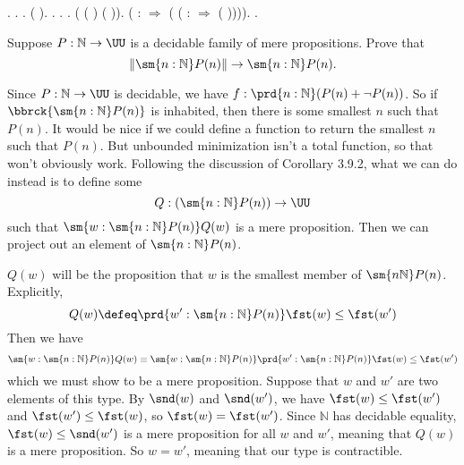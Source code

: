 \begin{coqdoccode}
\coqdocnoindent
{}.\coqdoceol
\coqdocindent{1.00em}
.\coqdoceol
\coqdocindent{1.00em}
    .  (  ).  . .\coqdoceol
\coqdocindent{1.00em}
   .  ( (  \coqdocnotation{\ensuremath{\lnot}}) ( )).\coqdoceol
\coqdocindent{1.00em}
 (  : \coqdocnotation{\ensuremath{\lnot}} \coqdocnotation{(}  \coqdocnotation{\ensuremath{\lnot}} \coqdocnotation{)} \ensuremath{\Rightarrow}  ( ( : \ensuremath{\Rightarrow}  ( )))).\coqdoceol
\coqdocnoindent
{}.\coqdoceol
\coqdocemptyline
\coqdocemptyline
\end{coqdoccode}
Suppose $P : \mathbb{N} \to \UU$ is a decidable family of mere propositions.
Prove that
\[
  \left\lVert \sm{n:\mathbb{N}} P(n) \right\rVert
  \to
  \sm{n:\mathbb{N}} P(n).
\]


 \soln
Since $P : \mathbb{N} \to \UU$ is decidable, we have $f : \prd{n:\mathbb{N}}
(P(n) + \lnot P(n))$.  So if $\bbrck{\sm{n:\mathbb{N}}
P(n)}$ is inhabited, then there is some smallest $n$ such that $P(n)$.
It would be nice if we could define a function to return the
smallest $n$ such that $P(n)$.  But unbounded minimization isn't a
total function, so that won't obviously work.  Following the
discussion of Corollary 3.9.2, what we can do instead is to define some
\[
  Q : \left(\sm{n:\mathbb{N}} P(n)\right) \to \UU
\]
such that $\sm{w:\sm{n:\mathbb{N}} P(n)} Q(w)$ is a mere proposition.  Then
we can project out an element of $\sm{n:\mathbb{N}} P(n)$.


$Q(w)$ will be the proposition that $w$ is the smallest member of
$\sm{n\mathbb{N}}P(n)$.  Explicitly,
\[
  Q(w) \defeq 
  \prd{w' : \sm{n:\mathbb{N}}P(n)} \fst(w) \leq \fst(w')
\]
Then we have
\[
  \sm{w : \sm{n : \mathbb{N}} P(n)} Q(w)
  \equiv
  \sm{w : \sm{n : \mathbb{N}} P(n)}
  \prd{w' : \sm{n:\mathbb{N}}P(n)} \fst(w) \leq \fst(w')
\]
which we must show to be a mere proposition.  Suppose that $w$ and $w'$ are two
elements of this type.  By $\snd(w)$ and $\snd(w')$, we have $\fst(w) \leq
\fst(w')$ and $\fst(w') \leq \fst(w)$, so $\fst(w) = \fst(w')$.  Since
$\mathbb{N}$ has decidable equality, $\fst(w) \leq \snd(w')$ is a mere
proposition for all $w$ and $w'$, meaning that $Q(w)$ is a mere proposition.
So $w = w'$, meaning that our type is contractible.


